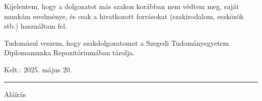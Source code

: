 \documentclass[12pt]{report} %
\begin{document}
Kijelentem, hogy a dolgozatot más szakon korábban nem védtem meg, saját munkám eredménye, és csak a hivatkozott forrásokat (szakirodalom, eszközök stb.) használtam fel.

Tudomásul veszem, hogy szakdolgozatomat a Szegedi Tudományegyetem Diplomamunka Repozitóriumában tárolja.

\vspace{1cm}

{\large Kelt.: 2025. május 20.}

\vspace{0.5cm}
\hfill
\parbox{5cm}{\centering\hrule\vspace{0.3cm} Aláírás}
\end{document}
